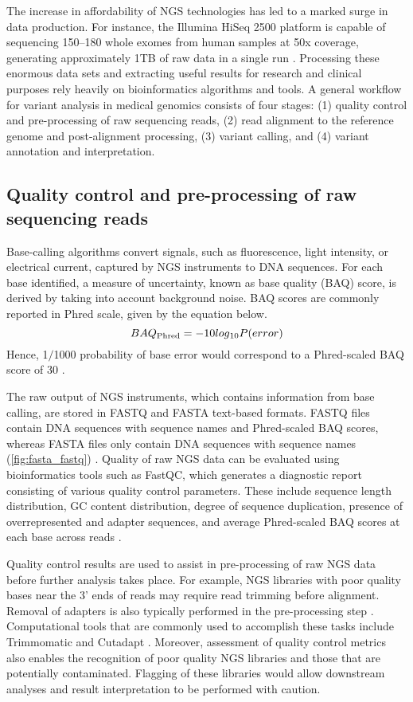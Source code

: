 The increase in affordability of NGS technologies has led to a marked surge in data production. For instance, the Illumina HiSeq 2500 platform is capable of sequencing 150--180 whole exomes from human samples at 50x coverage, generating approximately 1TB of raw data in a single run \cite{Dong2015}. Processing these enormous data sets and extracting useful results for research and clinical purposes rely heavily on bioinformatics algorithms and tools. A general workflow for variant analysis in medical genomics consists of four stages: (1) quality control and pre-processing of raw sequencing reads, (2) read alignment to the reference genome and post-alignment processing, (3) variant calling, and (4) variant annotation and interpretation.

\subsection{Quality control and pre-processing of raw sequencing reads}

Base-calling algorithms convert signals, such as fluorescence, light intensity, or electrical current, captured by NGS instruments to DNA sequences. For each base identified, a measure of uncertainty, known as base quality (\acs{BAQ}) score, is derived by taking into account background noise. BAQ scores are commonly reported in Phred scale, given by the equation below. $$BAQ\textsubscript{Phred} = -10log\textsubscript{10}P(error)$$ Hence, 1$/$1000 probability of base error would correspond to a Phred-scaled BAQ score of 30 \cite{Nielsen2011a, Ledergerber2011}.

The raw output of NGS instruments, which contains information from base calling, are stored in FASTQ and FASTA text-based formats. FASTQ files contain DNA sequences with sequence names and Phred-scaled BAQ scores, whereas FASTA files only contain DNA sequences with sequence names (\autoref{fig:fasta_fastq}) \cite{Bao2014, Mielczarek2016}. Quality of raw NGS data can be evaluated using bioinformatics tools such as FastQC, which generates a diagnostic report consisting of various quality control parameters. These include sequence length distribution, GC content distribution, degree of sequence duplication, presence of overrepresented and adapter sequences, and average Phred-scaled BAQ scores at each base across reads \cite{Andrews2017}.

Quality control results are used to assist in pre-processing of raw NGS data before further analysis takes place. For example, NGS libraries with poor quality bases near the 3' ends of reads may require read trimming before alignment. Removal of adapters is also typically performed in the pre-processing step \cite{Bao2014}. Computational tools that are commonly used to accomplish these tasks include Trimmomatic \cite{Bolger2014} and Cutadapt \cite{Marcel2011}. Moreover, assessment of quality control metrics also enables the recognition of poor quality NGS libraries and those that are potentially contaminated. Flagging of these libraries would allow downstream analyses and result interpretation to be performed with caution.

